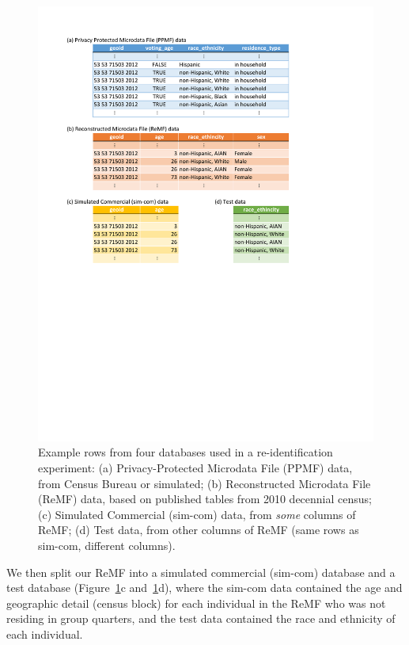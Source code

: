 \documentclass{article}
\begin{document}
\begin{figure}[ht]
\vskip 0.2in
\begin{center}
\centerline{\includegraphics[width=\columnwidth]{tex/ppmf_reid_db_fig_cropped.pdf}}
\caption{Example rows from four databases used in a re-identification experiment: (a) Privacy-Protected Microdata File (PPMF) data, from Census Bureau or simulated; (b) Reconstructed Microdata File (ReMF) data, based on published tables from 2010 decennial census; (c) Simulated Commercial (sim-com) data, from \emph{some} columns of ReMF; (d) Test data, from other columns of ReMF (same rows as sim-com, different columns).}
\label{db}
\end{center}
\vskip -0.2in
\end{figure}

We then split our ReMF into a simulated commercial (sim-com) database and a test database (Figure~\ref{db}c and~\ref{db}d), where the sim-com data contained the age and geographic detail (census block) for each individual in the ReMF who was not residing in group quarters, and the test data contained the race and ethnicity of each individual.
\end{document}

